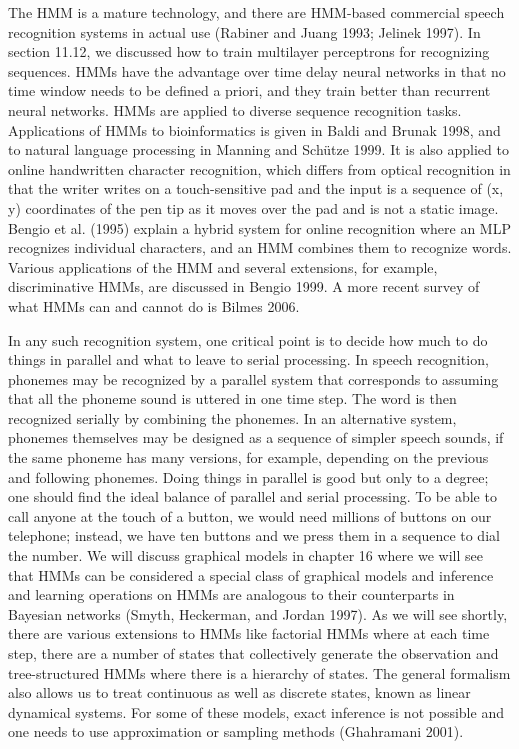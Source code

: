 The HMM is a mature technology, and there are HMM-based commercial speech recognition systems in actual use (Rabiner and Juang 1993; Jelinek 1997). In section 11.12, we discussed how to train multilayer perceptrons for recognizing sequences. HMMs have the advantage over time delay neural networks in that no time window needs to be defined a priori, and they train better than recurrent neural networks. HMMs are applied to diverse sequence recognition tasks. Applications of HMMs to bioinformatics is given in Baldi and Brunak 1998, and to natural language processing in Manning and Schütze 1999. It is also applied to online handwritten character recognition, which differs from optical recognition in that the writer writes on a touch-sensitive pad and the input is a sequence of (x, y) coordinates of the pen tip as it moves over the pad and is not a static image. Bengio et al. (1995) explain a hybrid system for online recognition where an MLP recognizes individual characters, and an HMM combines them to recognize words. Various applications of the HMM and several extensions, for example, discriminative HMMs, are discussed in Bengio 1999. A more recent survey of what HMMs can and cannot do is Bilmes 2006.

In any such recognition system, one critical point is to decide how much to do things in parallel and what to leave to serial processing. In speech recognition, phonemes may be recognized by a parallel system that corresponds to assuming that all the phoneme sound is uttered in one time step. The word is then recognized serially by combining the phonemes. In an alternative system, phonemes themselves may be designed as a sequence of simpler speech sounds, if the same phoneme has many versions, for example, depending on the previous and following phonemes. Doing things in parallel is good but only to a degree; one should find the ideal balance of parallel and serial processing. To be able to call anyone at the touch of a button, we would need millions of buttons on our telephone; instead, we have ten buttons and we press them in a sequence to dial the number. We will discuss graphical models in chapter 16 where we will see that HMMs can be considered a special class of graphical models and inference and learning operations on HMMs are analogous to their counterparts in Bayesian networks (Smyth, Heckerman, and Jordan 1997). As we will see shortly, there are various extensions to HMMs like factorial HMMs where at each time step, there are a number of states that collectively generate the observation and tree-structured HMMs where there is a hierarchy of states. The general formalism also allows us to treat continuous as well as discrete states, known as linear dynamical systems. For some of these models, exact inference is not possible and one needs to use approximation or sampling methods (Ghahramani 2001).

